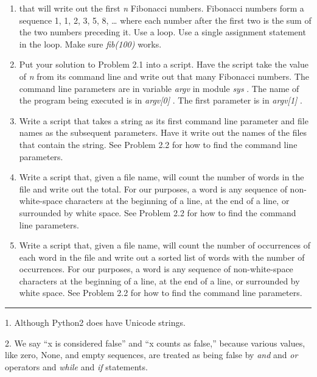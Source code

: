 \begin{enumerate}

\item
  
  that will write out the first \emph{n} Fibonacci numbers. Fibonacci
  numbers form a sequence 1, 1, 2, 3, 5, 8, \ldots{} where each number
  after the first two is the sum of the two numbers preceding it. Use a
  loop. Use a single assignment statement in the loop. Make sure
  \emph{fib(100)} works.
\item
  Put your solution to Problem 2.1
  into a script. Have the script take the value of \emph{n} from its
  command line and write out that many Fibonacci numbers. The command
  line parameters are in variable \emph{argv} in module \emph{sys} . The
  name of the program being executed is in \emph{argv{[}0{]}} . The
  first parameter is in \emph{argv{[}1{]}} .
\item
  Write a script that takes a
  string as its first command line parameter and file names as the
  subsequent parameters. Have it write out the names of the files that
  contain the string. See Problem 2.2 for how to find the command line
  parameters.
\item
  Write a script that, given a
  file name, will count the number of words in the file and write out
  the total. For our purposes, a word is any sequence of non-white-space
  characters at the beginning of a line, at the end of a line, or
  surrounded by white space. See Problem 2.2 for how to find the command
  line parameters.
\item
  Write a script that, given a
  file name, will count the number of occurrences of each word in the
  file and write out a sorted list of words with the number of
  occurrences. For our purposes, a word is any sequence of
  non-white-space characters at the beginning of a line, at the end of a
  line, or surrounded by white space. See Problem 2.2 for how to find
  the command line parameters.
\end{enumerate}

\begin{center}\rule{0.5\linewidth}{\linethickness}\end{center}

{ 1.} Although Python2 does have
Unicode strings.

{ 2.} We say ``x is considered
false'' and ``x counts as false,'' because various values, like zero,
None, and empty sequences, are treated as being false by \emph{and} and
\emph{or} operators and \emph{while} and \emph{if} statements.
